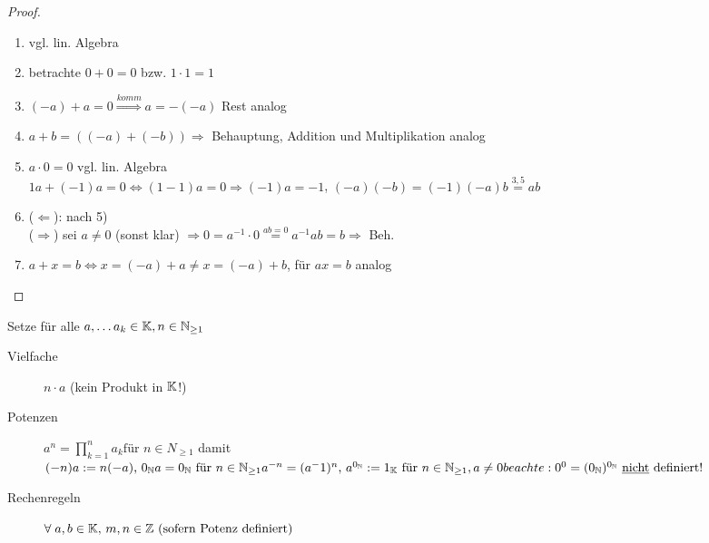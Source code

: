 \begin{proof}
	\begin{enumerate}[zu 1)]
		\item vgl. lin. Algebra
		\item betrachte $0 + 0 = 0$ bzw. $1 \cdot 1 = 1$
		\item $(-a) + a = 0 \overset{komm}{\Rightarrow} a = -(-a)$ Rest analog
		\item $a+b = ((-a) + (-b)) \Rightarrow$ Behauptung, Addition und Multiplikation analog
		\item $a\cdot 0 = 0$ vgl. lin. Algebra\\
		$1a + (-1)a = 0 \Leftrightarrow (1-1)a=0 \Rightarrow (-1)a=-1$, $(-a)(-b)=(-1)(-a)b\overset{3,5}{=}ab$
		\item ($\Leftarrow$): nach 5)\\
		($\Rightarrow$) sei $a\neq0$ (sonst klar) $\Rightarrow 0 = a^{-1}\cdot 0 \overset{ab=0}{=} a^{-1}ab = b \Rightarrow$ Beh.
		\item $a+x=b \Leftrightarrow x = (-a) + a \neq x = (-a) + b$, für $ax=b$ analog \QEDA
	\end{enumerate}
\end{proof}

\noindent Setze für alle $a, \dots a_k \in \mathbb{K},n\in \mathbb{N}_{\geq 1}$
\begin{description}
	\item[Vielfache] $n\cdot a$ (kein Produkt in $\mathbb{K}$!)
	\item[Potenzen] $a^n=\prod_{k=1}^{n} a_k \text{für } n \in N_{\geq 1}$ damit $(-n)a:=n(-a) \text{, } 0_{\mathbb{N}}a=0_{\mathbb{N}} \text{ für } n\in\mathbb{N}_{\geq1}\\
	a^{-n}=(a^-1)^n \text{, }a^{0_{\mathbb{N}}}:=1_{\mathbb{K}} \text{ für } n \in \mathbb{N}_{\geq 1}, a \neq 0\\
	beachte: 0^0 = (0_{\mathbb{N}})^{0_{\mathbb{N}}} \text{ \underline{nicht} definiert!}$
	\item[Rechenregeln] $\forall\;a,b\in \mathbb{K}\text{, } m,n\in \mathbb{Z} \text{ (sofern Potenz definiert) } $
\end{description}
